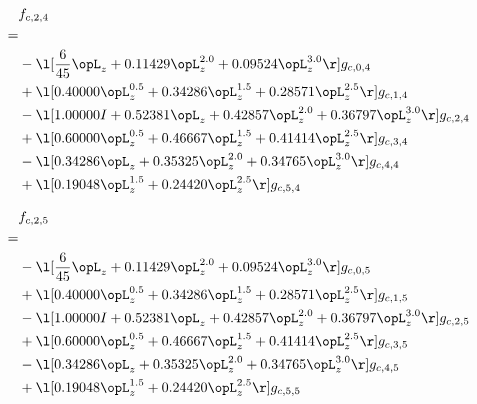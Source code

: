 \begin{alignat}{2} 
\label{eq:f_24_0} 
& f_{c,2,4} \nonumber \\ 
 = \\ 
& - \l[ \frac{6}{45} \opL_z +  0.11429 \opL_z^{2.0} +  0.09524 \opL_z^{3.0}  \r] g_{c,0,4} \nonumber \\ 
& + \l[  0.40000 \opL_z^{0.5} +  0.34286 \opL_z^{1.5} +  0.28571 \opL_z^{2.5}  \r] g_{c,1,4} \nonumber \\ 
& - \l[  1.00000 I +  0.52381 \opL_z +  0.42857 \opL_z^{2.0} +  0.36797 \opL_z^{3.0}  \r] g_{c,2,4} \nonumber \\ 
& + \l[  0.60000 \opL_z^{0.5} +  0.46667 \opL_z^{1.5} +  0.41414 \opL_z^{2.5}  \r] g_{c,3,4} \nonumber \\ 
& - \l[  0.34286 \opL_z +  0.35325 \opL_z^{2.0} +  0.34765 \opL_z^{3.0}  \r] g_{c,4,4} \nonumber \\ 
& + \l[  0.19048 \opL_z^{1.5} +  0.24420 \opL_z^{2.5}  \r] g_{c,5,4} \nonumber \\ 
\end{alignat} 


\begin{alignat}{2} 
\label{eq:f_25_0} 
& f_{c,2,5} \nonumber \\ 
 = \\ 
& - \l[ \frac{6}{45} \opL_z +  0.11429 \opL_z^{2.0} +  0.09524 \opL_z^{3.0}  \r] g_{c,0,5} \nonumber \\ 
& + \l[  0.40000 \opL_z^{0.5} +  0.34286 \opL_z^{1.5} +  0.28571 \opL_z^{2.5}  \r] g_{c,1,5} \nonumber \\ 
& - \l[  1.00000 I +  0.52381 \opL_z +  0.42857 \opL_z^{2.0} +  0.36797 \opL_z^{3.0}  \r] g_{c,2,5} \nonumber \\ 
& + \l[  0.60000 \opL_z^{0.5} +  0.46667 \opL_z^{1.5} +  0.41414 \opL_z^{2.5}  \r] g_{c,3,5} \nonumber \\ 
& - \l[  0.34286 \opL_z +  0.35325 \opL_z^{2.0} +  0.34765 \opL_z^{3.0}  \r] g_{c,4,5} \nonumber \\ 
& + \l[  0.19048 \opL_z^{1.5} +  0.24420 \opL_z^{2.5}  \r] g_{c,5,5} \nonumber \\ 
\end{alignat} 


